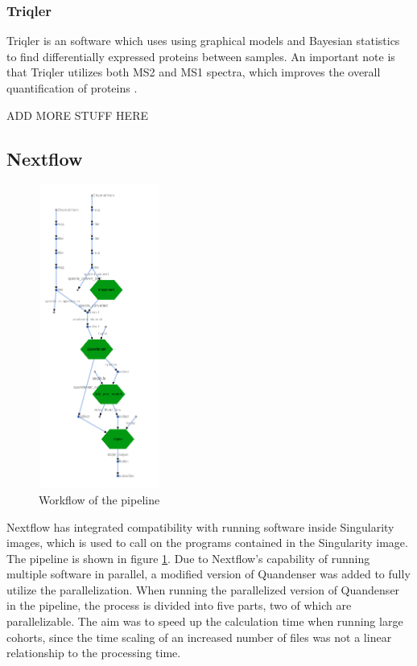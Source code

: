 \subsubsection{Triqler}
Triqler is an software which uses using graphical models and Bayesian statistics to find differentially expressed proteins between samples. An important note is that Triqler utilizes both MS2 and MS1 spectra, which improves the overall quantification of proteins \cite{triqler}.

ADD MORE STUFF HERE

\newpage
\subsection{Nextflow}
\begin{figure}
  \centering
  \includegraphics[width=4cm, height=10cm]{pictures/workflow.png}
  \caption{Workflow of the pipeline}
  \label{fig:workflow}
\end{figure}

Nextflow has integrated compatibility with running software inside Singularity images, which is used to call on the programs contained in the Singularity image. The pipeline is shown in figure \ref{fig:workflow}. Due to Nextflow's capability of running multiple software in parallel, a modified version of Quandenser was added to fully utilize the parallelization. When running the parallelized version of Quandenser in the pipeline, the process is divided into five parts, two of which are parallelizable. The aim was to speed up the calculation time when running large cohorts, since the time scaling of an increased number of files was not a linear relationship to the processing time.

